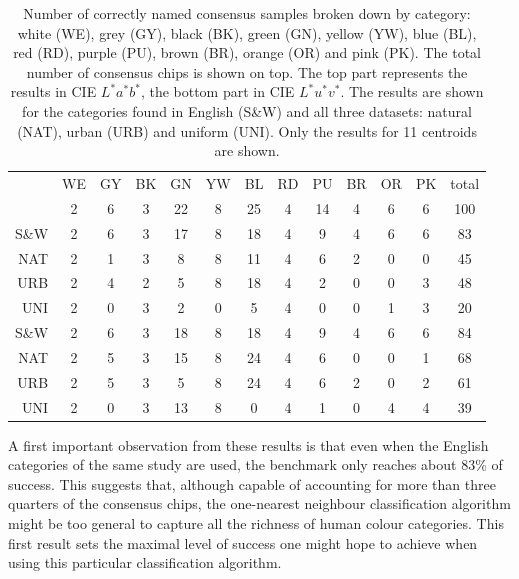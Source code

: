 \begin{table}[htbp]
  \centering
  \footnotesize
  \begin{tabular}{rcccccccccccc}
    \hline
    & WE & GY& BK & GN & YW & BL & RD & PU & BR & OR & PK & total\\
    & 2 & 6 & 3 &22 & 8 & 25 & 4 & 14 & 4 & 6 & 6 & 100 \\
    \hline
    S\&W & 2 & 6 & 3 & 17 & 8 & 18 & 4 & 9 & 4 & 6 & 6 & 83\\
    NAT & 2 & 1 & 3 & 8 & 8 & 11 & 4 & 6 & 2 & 0 & 0 & 45 \\
    URB & 2 & 4 & 2 & 5 & 8 & 18 & 4 & 2 & 0 & 0 & 3 & 48 \\
    UNI & 2 & 0 & 3 & 2 & 0 & 5 & 4 & 0 & 0 & 1 & 3 & 20 \\
    \hline
    S\&W & 2 & 6 & 3 & 18 & 8 & 18 & 4 & 9 & 4 & 6 & 6 & 84 \\
    NAT & 2 & 5 & 3 & 15 & 8 & 24 & 4 & 6 & 0 & 0 & 1 & 68 \\
    URB & 2 & 5 & 3 & 5 & 8 & 24 & 4 & 6 & 2 & 0 & 2 & 61 \\
    UNI & 2 & 0 & 3 & 13 & 8 & 0 & 4 & 1 & 0 & 4 & 4 & 39 \\
    \hline
  \end{tabular}
  \normalsize
  \caption[Naming benchmark for cluster centroids]{Number of correctly
    named consensus samples broken down by category: white (WE), grey
    (GY), black (BK), green (GN), yellow (YW), blue (BL), red (RD),
    purple (PU), brown (BR), orange (OR) and pink (PK). The total
    number of consensus chips is shown on top. The top part represents
    the results in CIE $L^*a^*b^*$, the bottom part in CIE
    $L^*u^*v^*$. The results are shown for the categories found in
    English (S\&W) and all three datasets: natural (NAT), urban (URB)
    and uniform (UNI). Only the results for 11 centroids are shown.}
  \label{t:clustering-benchmark}
\end{table}

A first important observation from these results is that even when
the English categories of the same study are used, the benchmark only
reaches about 83\% of success. This suggests that, although capable of
accounting for more than three quarters of the consensus chips, the
one-nearest neighbour classification algorithm might be too general to
capture all the richness of human colour categories. This first result
sets the maximal level of success one might hope to achieve when using
this particular classification algorithm.


